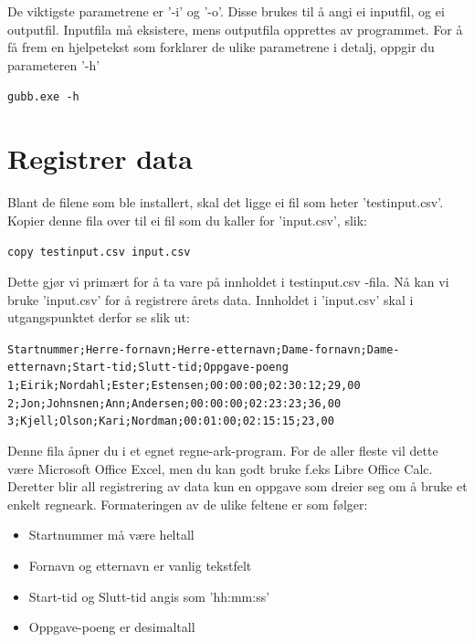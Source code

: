 \documentclass[12pt]{book}
\begin{document}
De viktigste parametrene er '-i' og '-o'. Disse brukes til å angi ei inputfil, og ei outputfil. Inputfila må eksistere, mens outputfila opprettes av programmet. For å få frem en hjelpetekst som forklarer de ulike parametrene i detalj, oppgir du parameteren '-h'

\begin{alltt}
\texttt{gubb.exe -h{\Return} }
\end{alltt}



\newpage

\section{Registrer data}

Blant de filene som ble installert, skal det ligge ei fil som heter 'testinput.csv'.  Kopier denne fila over til ei fil som du kaller for 'input.csv', slik:

\begin{alltt}
\texttt{copy testinput.csv input.csv  {\Return} }
\end{alltt}

Dette gjør vi primært for å ta vare på innholdet i testinput.csv -fila. Nå kan vi bruke 'input.csv' for å registrere årets data. Innholdet i 'input.csv' skal i utgangspunktet derfor se slik ut:

\scriptsize
\begin{alltt}
Startnummer;Herre-fornavn;Herre-etternavn;Dame-fornavn;Dame-etternavn;Start-tid;Slutt-tid;Oppgave-poeng
1;Eirik;Nordahl;Ester;Estensen;00:00:00;02:30:12;29,00
2;Jon;Johnsnen;Ann;Andersen;00:00:00;02:23:23;36,00
3;Kjell;Olson;Kari;Nordman;00:01:00;02:15:15;23,00
\end{alltt}

\normalsize

Denne fila åpner du i et egnet regne-ark-program. For de aller fleste vil dette være Microsoft Office Excel, men du kan godt bruke f.eks Libre Office Calc. Deretter blir all registrering av data kun en oppgave som dreier seg om å bruke et enkelt regneark. Formateringen av de ulike feltene er som følger:

\begin{itemize}
  \item Startnummer må være heltall
  \item Fornavn og etternavn er vanlig tekstfelt
  \item Start-tid og Slutt-tid angis som 'hh:mm:ss'
  \item Oppgave-poeng er desimaltall
\end{itemize}
\end{document}
